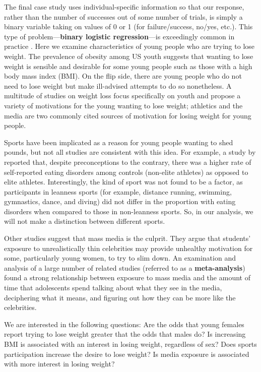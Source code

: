 \documentclass[
]{krantz}
\begin{document}
The final case study uses individual-specific information so that our response, rather than the number of successes out of some number of trials, is simply a binary variable taking on values of 0 or 1 (for failure/success, no/yes, etc.). This type of problem---\textbf{binary logistic regression}---is exceedingly common in practice . Here we examine characteristics of young people who are trying to lose weight. The prevalence of obesity among US youth suggests that wanting to lose weight is sensible and desirable for some young people such as those with a high body mass index (BMI). On the flip side, there are young people who do not need to lose weight but make ill-advised attempts to do so nonetheless. A multitude of studies on weight loss focus specifically on youth and propose a variety of motivations for the young wanting to lose weight; athletics and the media are two commonly cited sources of motivation for losing weight for young people.

Sports have been implicated as a reason for young people wanting to shed pounds, but not all studies are consistent with this idea. For example, a study by \citet{Martinsen2009} reported that, despite preconceptions to the contrary, there was a higher rate of self-reported eating disorders among controls (non-elite athletes) as opposed to elite athletes. Interestingly, the kind of sport was not found to be a factor, as participants in leanness sports (for example, distance running, swimming, gymnastics, dance, and diving) did not differ in the proportion with eating disorders when compared to those in non-leanness sports. So, in our analysis, we will not make a distinction between different sports.

Other studies suggest that mass media is the culprit. They argue that students' exposure to unrealistically thin celebrities may provide unhealthy motivation for some, particularly young women, to try to slim down. An examination and analysis of a large number of related studies (referred to as a \textbf{meta-analysis}) \citep{Grabe2008} found a strong relationship between exposure to mass media and the amount of time that adolescents spend talking about what they see in the media, deciphering what it means, and figuring out how they can be more like the celebrities.

We are interested in the following questions: Are the odds that young females report trying to lose weight greater that the odds that males do? Is increasing BMI is associated with an interest in losing weight, regardless of sex? Does sports participation increase the desire to lose weight? Is media exposure is associated with more interest in losing weight?
\end{document}

